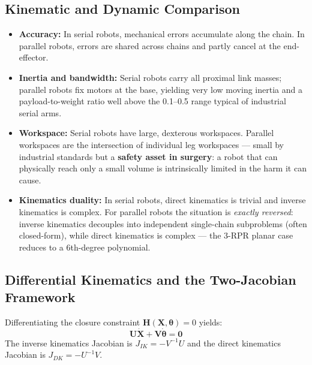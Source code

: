 \documentclass[11pt,a4paper,twoside]{report}
\begin{document}
\subsection{Kinematic and Dynamic Comparison}
\begin{itemize}
    \item \textbf{Accuracy:} In serial robots, mechanical errors accumulate along the chain. In parallel robots, errors are shared across chains and partly cancel at the end-effector.
    \item \textbf{Inertia and bandwidth:} Serial robots carry all proximal link masses; parallel robots fix motors at the base, yielding very low moving inertia and a payload-to-weight ratio well above the 0.1--0.5 range typical of industrial serial arms.
    \item \textbf{Workspace:} Serial robots have large, dexterous workspaces. Parallel workspaces are the intersection of individual leg workspaces — small by industrial standards but a \textbf{safety asset in surgery}: a robot that can physically reach only a small volume is intrinsically limited in the harm it can cause.
    \item \textbf{Kinematics duality:} In serial robots, direct kinematics is trivial and inverse kinematics is complex. For parallel robots the situation is \textit{exactly reversed}: inverse kinematics decouples into independent single-chain subproblems (often closed-form), while direct kinematics is complex — the 3-RPR planar case reduces to a 6th-degree polynomial.
\end{itemize}

\subsection{Differential Kinematics and the Two-Jacobian Framework}
Differentiating the closure constraint $\mathbf{H}(\mathbf{X}, \boldsymbol{\theta}) = 0$ yields:
\begin{equation}
    \mathbf{U}\dot{\mathbf{X}} + \mathbf{V}\dot{\boldsymbol{\theta}} = \mathbf{0}
\end{equation}
The inverse kinematics Jacobian is $J_{IK} = -V^{-1}U$ and the direct kinematics Jacobian is $J_{DK} = -U^{-1}V$.
\end{document}
